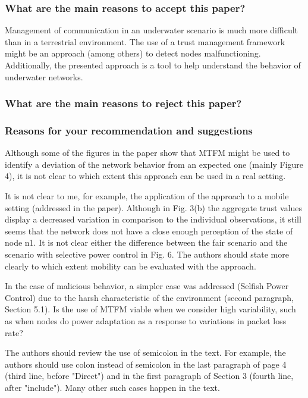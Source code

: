 \documentclass[runningheads,a4paper]{llncs}
\begin{document}
\subsubsection{What are the main reasons to accept this paper?}

Management of communication in an underwater scenario is much more difficult than in a terrestrial environment. The use of a trust management framework might be an approach (among others) to detect nodes malfunctioning. Additionally, the presented approach is a tool to help understand the behavior of underwater networks.


\subsubsection{What are the main reasons to reject this paper?}


\subsubsection{Reasons for your recommendation and suggestions}

Although some of the figures in the paper show that MTFM might be used to identify a deviation of the network behavior from an expected one (mainly Figure 4), it is not clear to which extent this approach can be used in a real setting.

It is not clear to me, for example, the application of the approach to a mobile setting (addressed in the paper). Although in Fig. 3(b) the aggregate trust values display a decreased variation in comparison to the individual observations, it still seems that the network does not have a close enough perception of the state of node n1. It is not clear either the difference between the fair scenario and the scenario with selective power control in Fig. 6. The authors should state more clearly to which extent mobility can be evaluated with the approach.

In the case of malicious behavior, a simpler case was addressed (Selfish Power Control) due to the harsh characteristic of the environment (second paragraph, Section 5.1). Is the use of MTFM viable when we consider high variability, such as when nodes do power adaptation as a response to variations in packet loss rate? 

The authors should review the use of semicolon in the text. For example, the authors should use colon instead of semicolon in the last paragraph of page 4 (third line, before "Direct") and in the first paragraph of Section 3 (fourth line, after "include"). Many other such cases happen in the text.
\end{document}
